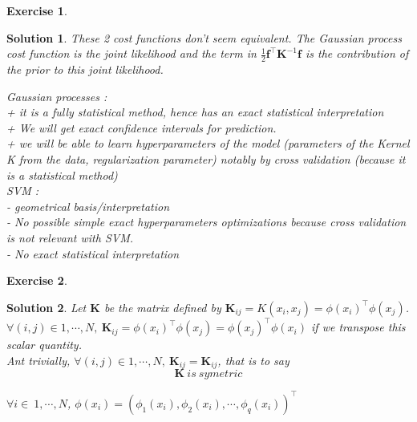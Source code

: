\documentclass[12pt,a4paper]{article}
\newtheorem{exercise}{Exercise}
\newtheorem{solution}{Solution}
\begin{document}
\begin{exercise}

\end{exercise}
\begin{solution}
These 2 cost functions don't seem equivalent. The Gaussian process cost function is the joint likelihood and the term in $\frac{1}{2} \boldsymbol{f}^\top \boldsymbol{K}^{-1} \boldsymbol f$ is the contribution of the prior to this joint likelihood. 

Gaussian processes :\\
+ it is a fully statistical method, hence has an exact statistical interpretation\\
+ We will get exact confidence intervals for prediction.\\
+ we will be able to learn hyperparameters of the model (parameters of the Kernel K from the data, regularization parameter) notably by cross validation (because it is a statistical method)\\

SVM :\\
- geometrical basis/interpretation \\
- No possible simple exact hyperparameters optimizations because cross validation is not relevant with SVM.\\
- No exact statistical interpretation \\
\end{solution}

\begin{exercise}
\end{exercise}
\begin{solution}
Let $\boldsymbol K$ be the matrix defined by $\boldsymbol K_{ij} = K(x_i,x_j) = \phi(x_i)^\top \phi(x_j)$.\\

$\forall (i,j) \in 1,\cdots,N, \ \boldsymbol K_{ij} = \phi(x_i)^\top \phi(x_j) = \phi(x_j)^\top\phi(x_i)$ if we transpose this scalar quantity.\\

Ant trivially,  $\forall (i,j) \in 1,\cdots,N, \ \boldsymbol K_{ij} = \boldsymbol K_{ij}$, that is to say $$\boxed{\boldsymbol K \ is\ symetric}$$

$\forall i \in \ 1,\cdots,N$, $\phi(x_i) = (\phi_1(x_i), \phi_2(x_i), \cdots, \phi_q(x_i))^\top$
\end{solution}
\end{document}
